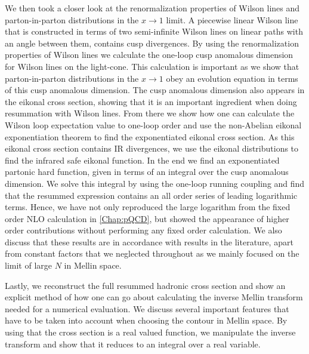 We then took a closer look at the renormalization properties of Wilson lines and parton-in-parton distributions in the $x\rightarrow 1$ limit. A piecewise linear Wilson line that is constructed in terms of two semi-infinite Wilson lines on linear paths with an angle between them, contains cusp divergences. By using the renormalization properties of Wilson lines we calculate the one-loop cusp anomalous dimension for Wilson lines on the light-cone. This calculation is important as we show that parton-in-parton distributions in the $x\rightarrow 1$ obey an evolution equation in terms of this cusp anomalous dimension. The cusp anomalous dimension also appears in the eikonal cross section, showing that it is an important ingredient when doing resummation with Wilson lines. From there we show how one can calculate the Wilson loop expectation value to one-loop order and use the non-Abelian eikonal exponentiation theorem to find the exponentiated eikonal cross section. As this eikonal cross section contains IR divergences, we use the eikonal distributions to find the infrared safe eikonal function. In the end we find an exponentiated partonic hard function, given in terms of an integral over the cusp anomalous dimension. We solve this integral by using the one-loop running coupling and find that the resummed expression contains an all order series of leading logarithmic terms. Hence, we have not only reproduced the large logarithm from the fixed order NLO calculation in \cref{Chap:pQCD}, but showed the appearance of higher order contributions without performing any fixed order calculation. We also discuss that these results are in accordance with results in the literature, apart from constant factors that we neglected throughout as we mainly focused on the limit of large $N$ in Mellin space.

Lastly, we reconstruct the full resummed hadronic cross section and show an explicit method of how one can go about calculating the inverse Mellin transform needed for a numerical evaluation. We discuss several important features that have to be taken into account when choosing the contour in Mellin space. By using that the cross section is a real valued function, we manipulate the inverse transform and show that it reduces to an integral over a real variable.

